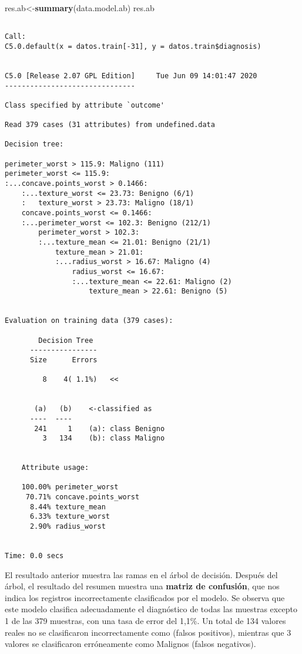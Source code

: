 \documentclass[
]{article}
\newenvironment{Shaded}{\begin{snugshade}}{\end{snugshade}}
\newcommand{\KeywordTok}[1]{\textcolor[rgb]{0.13,0.29,0.53}{\textbf{#1}}}
\newcommand{\NormalTok}[1]{#1}
\begin{document}
\begin{Shaded}
\begin{Highlighting}[]
\NormalTok{res.ab<-}\KeywordTok{summary}\NormalTok{(data.model.ab)}
\NormalTok{res.ab}
\end{Highlighting}
\end{Shaded}

\begin{verbatim}

Call:
C5.0.default(x = datos.train[-31], y = datos.train$diagnosis)


C5.0 [Release 2.07 GPL Edition]     Tue Jun 09 14:01:47 2020
-------------------------------

Class specified by attribute `outcome'

Read 379 cases (31 attributes) from undefined.data

Decision tree:

perimeter_worst > 115.9: Maligno (111)
perimeter_worst <= 115.9:
:...concave.points_worst > 0.1466:
    :...texture_worst <= 23.73: Benigno (6/1)
    :   texture_worst > 23.73: Maligno (18/1)
    concave.points_worst <= 0.1466:
    :...perimeter_worst <= 102.3: Benigno (212/1)
        perimeter_worst > 102.3:
        :...texture_mean <= 21.01: Benigno (21/1)
            texture_mean > 21.01:
            :...radius_worst > 16.67: Maligno (4)
                radius_worst <= 16.67:
                :...texture_mean <= 22.61: Maligno (2)
                    texture_mean > 22.61: Benigno (5)


Evaluation on training data (379 cases):

        Decision Tree   
      ----------------  
      Size      Errors  

         8    4( 1.1%)   <<


       (a)   (b)    <-classified as
      ----  ----
       241     1    (a): class Benigno
         3   134    (b): class Maligno


    Attribute usage:

    100.00% perimeter_worst
     70.71% concave.points_worst
      8.44% texture_mean
      6.33% texture_worst
      2.90% radius_worst


Time: 0.0 secs
\end{verbatim}

El resultado anterior muestra las ramas en el árbol de decisión. Después
del árbol, el resultado del resumen muestra una \textbf{matriz de
confusión}, que nos indica los registros incorrectamente clasificados
por el modelo. Se observa que este modelo clasifica adecuadamente el
diagnóstico de todas las muestras excepto 1 de las 379 muestras, con una
tasa de error del 1,1\%. Un total de 134 valores reales no se
clasificaron incorrectamente como (falsos positivos), mientras que 3
valores se clasificaron erróneamente como Malignos (falsos negativos).
\end{document}
